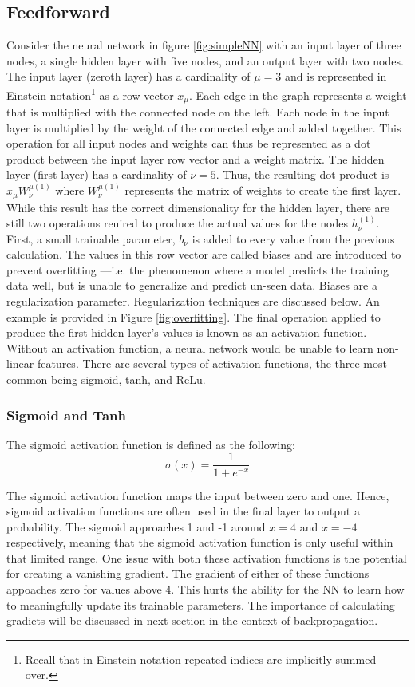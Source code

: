 \subsection{Feedforward}
Consider the neural network in figure \ref{fig:simpleNN} with an input layer of three nodes, a single hidden layer with five nodes, and an output layer with two nodes. The input layer (zeroth layer) has a cardinality of $ \mu=3 $ and is represented in Einstein notation\footnote{Recall that in Einstein notation repeated indices are implicitly summed over.} as a row vector $ x_\mu $. Each edge in the graph represents a weight that is multiplied with the connected node on the left. Each node in the input layer is multiplied by the weight of the connected edge and added together. This operation for all input nodes and weights can thus be represented as a dot product between the input layer row vector and a weight matrix. The hidden layer (first layer) has a cardinality of $ \nu=5 $. Thus, the resulting dot product is $ x_\mu W_\nu^{\mu(1)} $ where $ W_\nu^{\mu(1)} $ represents the matrix of weights to create the first layer. While this result has the correct dimensionality for the hidden layer, there are still two operations reuired to produce the actual values for the nodes $ h_\nu^{(1)} $. First, a small trainable parameter, $ b_\nu $  is added to every value from the previous calculation. The values in this row vector are called biases and are introduced to prevent overfitting ---i.e. the phenomenon where a model predicts the training data well, but is unable to generalize and predict un-seen data. Biases are a regularization parameter. Regularization techniques are discussed below. An example is provided in Figure \ref{fig:overfitting}. The final operation applied to produce the first hidden layer's values is known as an activation function. Without an activation function, a neural network would be unable to learn non-linear features. There are several types of activation functions, the three most common being sigmoid, tanh, and ReLu.


\subsubsection{Sigmoid and Tanh}
The sigmoid activation function is defined as the following:
\begin{equation}
    \label{sigmoid}
    \sigma (x) = \frac{1}{1 + e^{-x}}
\end{equation}

The sigmoid activation function maps the input between zero and one. Hence, sigmoid activation functions are often used in the final layer to output a probability. The sigmoid approaches 1 and -1 around $ x=4 $ and $ x=-4 $ respectively, meaning that the sigmoid activation function is only useful within that limited range. One issue with both these activation functions is the potential for creating a vanishing gradient. The gradient of either of these functions appoaches zero for values above 4. This hurts the ability for the NN to learn how to meaningfully update its trainable parameters. The importance of calculating gradiets will be discussed in next section in the context of backpropagation. 

